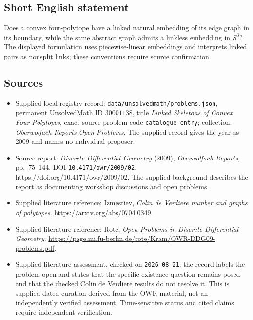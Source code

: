 \documentclass[11pt]{article}
\begin{document}
\subsection{Short English statement}
Does a convex four-polytope have a linked natural embedding of its edge graph in its boundary, while the same abstract graph admits a linkless embedding in \(S^3\)? The displayed formulation uses piecewise-linear embeddings and interprets linked pairs as nonsplit links; these conventions require source confirmation.
\subsection{Sources}
\begin{itemize}
\item Supplied local registry record: \texttt{data/unsolvedmath/problems.json}, permanent UnsolvedMath ID \(30001138\), title \emph{Linked Skeletons of Convex Four-Polytopes}, exact source problem code \texttt{catalogue entry}; collection: \emph{Oberwolfach Reports Open Problems}. The supplied record gives the year as 2009 and names no individual proposer.
\item Source report: \emph{Discrete Differential Geometry} (2009), \emph{Oberwolfach Reports}, pp.\ 75--144, DOI \texttt{10.4171/owr/2009/02}. \url{https://doi.org/10.4171/owr/2009/02}. The supplied background describes the report as documenting workshop discussions and open problems.
\item Supplied literature reference: Izmestiev, \emph{Colin de Verdiere number and graphs of polytopes}. \url{https://arxiv.org/abs/0704.0349}.
\item Supplied literature reference: Rote, \emph{Open Problems in Discrete Differential Geometry}. \url{https://page.mi.fu-berlin.de/rote/Kram/OWR-DDG09-problems.pdf}.
\item Supplied literature assessment, checked on \texttt{2026-08-21}: the record labels the problem open and states that the specific existence question remains posed and that the checked Colin de Verdiere results do not resolve it. This is supplied dated curation derived from the OWR material, not an independently verified assessment. Time-sensitive status and cited claims require independent verification.
\end{itemize}
\end{document}
